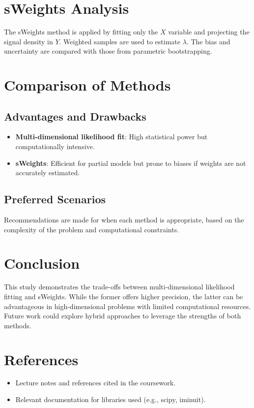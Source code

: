 \documentclass[12pt,a4paper]{article}
\begin{document}
\section{sWeights Analysis}
\label{sec:sweights}
The sWeights method is applied by fitting only the $X$ variable and projecting the signal density in $Y$. Weighted samples are used to estimate $\lambda$. The bias and uncertainty are compared with those from parametric bootstrapping.

\section{Comparison of Methods}
\label{sec:comparison}
\subsection{Advantages and Drawbacks}
\begin{itemize}
    \item \textbf{Multi-dimensional likelihood fit}: High statistical power but computationally intensive.
    \item \textbf{sWeights}: Efficient for partial models but prone to biases if weights are not accurately estimated.
\end{itemize}
\subsection{Preferred Scenarios}
Recommendations are made for when each method is appropriate, based on the complexity of the problem and computational constraints.

\section{Conclusion}
\label{sec:conclusion}
This study demonstrates the trade-offs between multi-dimensional likelihood fitting and sWeights. While the former offers higher precision, the latter can be advantageous in high-dimensional problems with limited computational resources. Future work could explore hybrid approaches to leverage the strengths of both methods.

\section*{References}
\begin{itemize}
    \item Lecture notes and references cited in the coursework.
    \item Relevant documentation for libraries used (e.g., scipy, iminuit).
\end{itemize}
\end{document}
